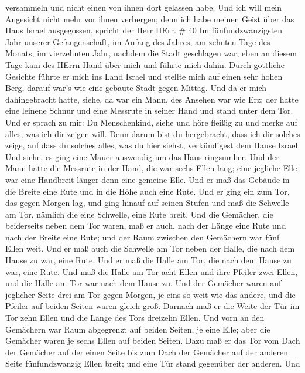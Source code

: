 versammeln und nicht einen von ihnen dort gelassen habe. 
Und ich will mein Angesicht nicht mehr vor ihnen verbergen; denn ich
habe meinen Geist über das Haus Israel ausgegossen, spricht der Herr
HErr. \# 40  Im fünfundzwanzigsten Jahr unserer
Gefangenschaft, im Anfang des Jahres, am zehnten Tage des Monats, im
vierzehnten Jahr, nachdem die Stadt geschlagen war, eben an diesem Tage
kam des HErrn Hand über mich und führte mich dahin.  Durch
göttliche Gesichte führte er mich ins Land Israel und stellte mich auf
einen sehr hohen Berg, darauf war's wie eine gebaute Stadt gegen Mittag.
 Und da er mich dahingebracht hatte, siehe, da war ein Mann,
des Ansehen war wie Erz; der hatte eine leinene Schnur und eine Messrute
in seiner Hand und stand unter dem Tor.  Und er sprach zu
mir: Du Menschenkind, siehe und höre fleißig zu und merke auf alles, was
ich dir zeigen will. Denn darum bist du hergebracht, dass ich dir
solches zeige, auf dass du solches alles, was du hier siehst,
verkündigest dem Hause Israel.  Und siehe, es ging eine
Mauer auswendig um das Haus ringsumher. Und der Mann hatte die Messrute
in der Hand, die war sechs Ellen lang; eine jegliche Elle war eine
Handbreit länger denn eine gemeine Elle. Und er maß das Gebäude in die
Breite eine Rute und in die Höhe auch eine Rute.  Und er
ging ein zum Tor, das gegen Morgen lag, und ging hinauf auf seinen
Stufen und maß die Schwelle am Tor, nämlich die eine Schwelle, eine Rute
breit.  Und die Gemächer, die beiderseits neben dem Tor
waren, maß er auch, nach der Länge eine Rute und nach der Breite eine
Rute; und der Raum zwischen den Gemächern war fünf Ellen weit. Und er
maß auch die Schwelle am Tor neben der Halle, die nach dem Hause zu war,
eine Rute.  Und er maß die Halle am Tor, die nach dem Hause
zu war, eine Rute.  Und maß die Halle am Tor acht Ellen und
ihre Pfeiler zwei Ellen, und die Halle am Tor war nach dem Hause zu.
 Und der Gemächer waren auf jeglicher Seite drei am Tor
gegen Morgen, je eins so weit wie das andere, und die Pfeiler auf beiden
Seiten waren gleich groß.  Darnach maß er die Weite der Tür
im Tor zehn Ellen und die Länge des Tors dreizehn Ellen. 
Und vorn an den Gemächern war Raum abgegrenzt auf beiden Seiten, je eine
Elle; aber die Gemächer waren je sechs Ellen auf beiden Seiten.
 Dazu maß er das Tor vom Dach der Gemächer auf der einen
Seite bis zum Dach der Gemächer auf der anderen Seite fünfundzwanzig
Ellen breit; und eine Tür stand gegenüber der anderen.  Und
